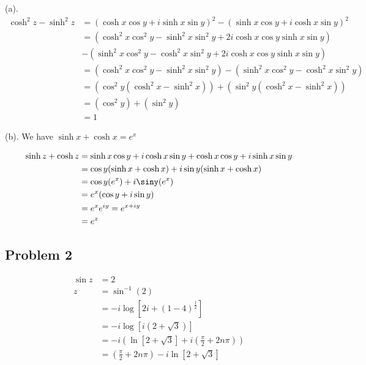 \documentclass[a4paper]{report}
\begin{document}
(a). 
\begin{align*}
    \cosh^2 z - \sinh^2 z &= (\cosh x \cos y + i \sinh x \sin y)^2 - (\sinh x \cos y + i \cosh x \sin y)^2\\
                          &= (\cosh^2 x \cos^2 y - \sinh^2 x \sin^2 y + 2i\cosh x \cos y \sinh x \sin y)\\
                          &-(\sinh^2 x \cos^2 y - \cosh^2 x \sin^2 y + 2i\cosh x \cos y \sinh x \sin y)\\
                          &=(\cosh^2 x \cos^2 y - \sinh^2 x \sin^2 y) - (\sinh^2 x \cos^2 y - \cosh^2 x \sin^2 y)\\
                          &=(\cos^2y (\cosh^2 x - \sinh^2 x)) + (\sin^2y (\cosh^2 x - \sinh^2 x))\\
                          &=(\cos^2y) + (\sin^2 y)\\
                          &=1
\end{align*}


(b). We have $\sinh x + \cosh x = e^x$


\begin{align*}
    \sinh z + \cosh z &= \sinh x \cos y + i\cosh x \sin y +  \cosh x \cos y + i\sinh x \sin y\\
                      &= \cos y(\sinh x + \cosh x) + i \sin y(\sinh x + \cosh x)\\
                      &= \cos y(e^x) + i\siny(e^{x})\\
                      &= e^{x}(\cos y + i \sin y)\\
                      &= e^{x}e^{iy} =  e^{x + iy}\\
                      &= e^{z}
\end{align*}


\subsection*{Problem 2}

\begin{align*}
    \sin z &= 2\\
    z &= \sin^{-1}(2)\\
      &= -i \log [2i + (1- 4)^{\frac{1}{2}}]\\
      &= -i \log [i(2 + \sqrt{3})]\\
      &= -i (\ln [2 + \sqrt{3}] + i(\frac{\pi}{2} + 2n\pi))\\
      &=  (\frac{\pi}{2} + 2n\pi) -i\ln [2 + \sqrt{3}]\\
\end{align*}
\end{document}
